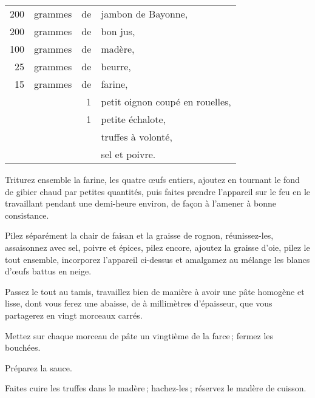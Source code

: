\footnotesize
\begin{longtable}{rrrp{16em}}
    200 & grammes & de & jambon de Bayonne,                                                               \\
    200 & grammes & de & bon jus,                                                                         \\
    100 & grammes & de & madère,                                                                          \\
     25 & grammes & de & beurre,                                                                          \\
     15 & grammes & de & farine,                                                                          \\
        &         &  1 & petit oignon coupé en rouelles,                                                  \\
        &         &  1 & petite échalote,                                                                 \\
        &         &    & truffes à volonté,                                                               \\
        &         &    & sel et poivre.                                                                   \\
\end{longtable}
\normalsize

Triturez ensemble la farine, les quatre œufs entiers, ajoutez en tournant le
fond de gibier chaud par petites quantités, puis faites prendre l'appareil sur
le feu en le travaillant pendant une demi-heure environ, de façon à l'amener
à bonne consistance.

Pilez séparément la chair de faisan et la graisse de rognon, réunissez-les,
assaisonnez avec sel, poivre et épices, pilez encore, ajoutez la graisse d'oie,
pilez le tout ensemble, incorporez l'appareil ci-dessus et amalgamez au mélange
les blancs d'œufs battus en neige.

Passez le tout au tamis, travaillez bien de manière à avoir une pâte homogène
et lisse, dont vous ferez une abaisse, de {\mmm} à {\mmm} millimètres
d'épaisseur, que vous partagerez en vingt morceaux carrés.

Mettez sur chaque morceau de pâte un vingtième de la farce ; fermez les
bouchées.

Préparez la sauce.

Faites cuire les truffes dans le madère ; hachez-les ; réservez le madère de
cuisson.

